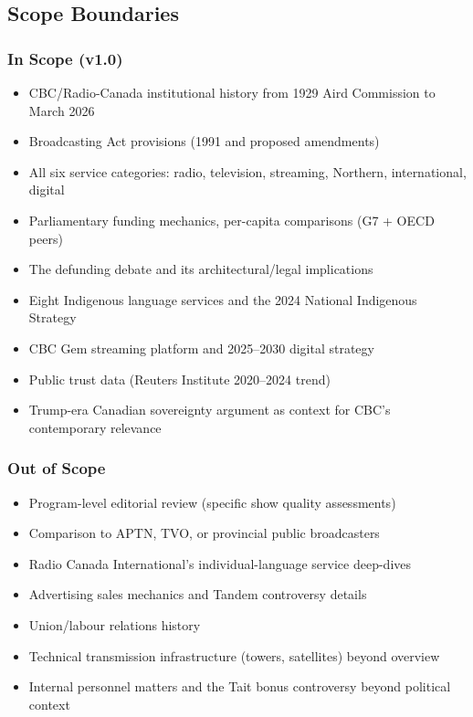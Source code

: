 \documentclass[11pt,letterpaper]{article}
\begin{document}
\subsection{Scope Boundaries}

\subsubsection{In Scope (v1.0)}
\begin{itemize}[noitemsep]
\item CBC/Radio-Canada institutional history from 1929 Aird Commission to March 2026
\item Broadcasting Act provisions (1991 and proposed amendments)
\item All six service categories: radio, television, streaming, Northern, international, digital
\item Parliamentary funding mechanics, per-capita comparisons (G7 + OECD peers)
\item The defunding debate and its architectural/legal implications
\item Eight Indigenous language services and the 2024 National Indigenous Strategy
\item CBC Gem streaming platform and 2025--2030 digital strategy
\item Public trust data (Reuters Institute 2020--2024 trend)
\item Trump-era Canadian sovereignty argument as context for CBC's contemporary relevance
\end{itemize}

\subsubsection{Out of Scope}
\begin{itemize}[noitemsep]
\item Program-level editorial review (specific show quality assessments)
\item Comparison to APTN, TVO, or provincial public broadcasters
\item Radio Canada International's individual-language service deep-dives
\item Advertising sales mechanics and Tandem controversy details
\item Union/labour relations history
\item Technical transmission infrastructure (towers, satellites) beyond overview
\item Internal personnel matters and the Tait bonus controversy beyond political context
\end{itemize}
\end{document}
